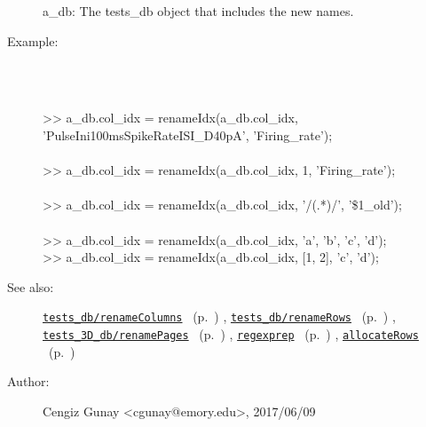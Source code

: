 \begin{description}
   a\_db: The tests\_db object that includes the new names.
%
\item[Example:]~
\begin{lyxcode} %
\\%
 >> a\_db.col\_idx = renameIdx(a\_db.col\_idx, 'PulseIni100msSpikeRateISI\_D40pA', 'Firing\_rate');
\\%
\\%
 >> a\_db.col\_idx = renameIdx(a\_db.col\_idx, 1, 'Firing\_rate');
\\%
\\%
 >> a\_db.col\_idx = renameIdx(a\_db.col\_idx, '/(.*)/', '\$1\_old');
\\%
\\%
 >> a\_db.col\_idx = renameIdx(a\_db.col\_idx, {'a', 'b'}, {'c', 'd'});
\\%
 >> a\_db.col\_idx = renameIdx(a\_db.col\_idx, [1, 2], {'c', 'd'});
\\%
\end{lyxcode}
%
\item[See also:]%
\hyperlink{ref_tests_db__renameColumns}{\texttt{tests\_db/renameColumns}}%
\ (p.~\pageref{ref_tests_db__renameColumns})%
%
, \hyperlink{ref_tests_db__renameRows}{\texttt{tests\_db/renameRows}}%
\ (p.~\pageref{ref_tests_db__renameRows})%
%
, \hyperlink{ref_tests_3D_db__renamePages}{\texttt{tests\_3D\_db/renamePages}}%
\ (p.~\pageref{ref_tests_3D_db__renamePages})%
%
, \hyperlink{ref_regexprep}{\texttt{regexprep}}%
\ (p.~\pageref{ref_regexprep})%
%
, \hyperlink{ref_allocateRows}{\texttt{allocateRows}}%
\ (p.~\pageref{ref_allocateRows})%
%
%
\item[Author:]%
Cengiz Gunay <cgunay@emory.edu>, 2017/06/09
%
\end{description}
\methodline%
